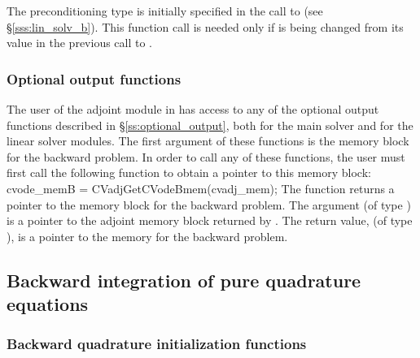 {
  The preconditioning type is initially specified in the call
  to  (see \S\ref{sss:lin_solv_b}). This function call is
  needed only if  is being changed from its value in the
  previous call to .
}

\subsubsection{Optional output functions}
The user of the adjoint module in {\cvodes} has access to any of the optional output 
functions described in \S\ref{ss:optional_output}, both for the main solver and for
the linear solver modules. The first argument of these  functions is
the {\cvodes} memory block for the backward problem. In order to call any of these
functions, the user must first call the following function to obtain a pointer to
this memory block:
{
  cvode\_memB = CVadjGetCVodeBmem(cvadj\_mem);
}
{
  The function  returns a pointer to the {\cvodes}
  memory block for the backward problem.
}
{
  The argument  (of type ) is a pointer to the
  adjoint memory block returned by .
}
{
  The return value,  (of type ), is a pointer to the
  {\cvodes} memory for the backward problem.
}
{}

\subsection{Backward integration of pure quadrature equations}

\subsubsection{Backward quadrature initialization functions}\label{sss:cvodequadmallocb}

